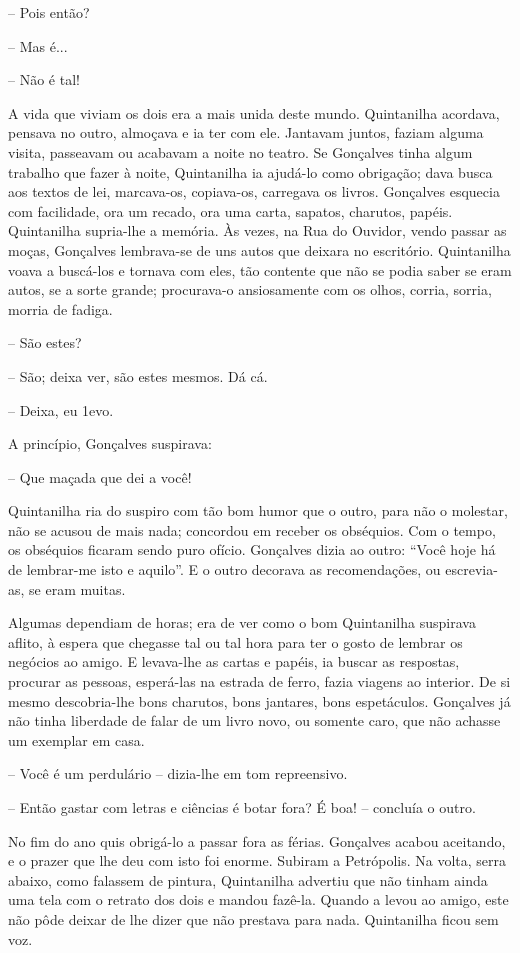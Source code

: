 -- Pois então?

-- Mas é...

-- Não é tal!

A vida que viviam os dois era a mais unida deste mundo. Quintanilha
acordava, pensava no outro, almoçava e ia ter com ele. Jantavam juntos,
faziam alguma visita, passeavam ou acabavam a noite no teatro. Se
Gonçalves tinha algum trabalho que fazer à noite, Quintanilha ia
ajudá-lo como obrigação; dava busca aos textos de lei, marcava-os,
copiava-os, carregava os livros. Gonçalves esquecia com facilidade, ora
um recado, ora uma carta, sapatos, charutos, papéis. Quintanilha
supria-lhe a memória. Às vezes, na Rua do Ouvidor, vendo passar as
moças, Gonçalves lembrava-se de uns autos que deixara no escritório.
Quintanilha voava a buscá-los e tornava com eles, tão contente que não
se podia saber se eram autos, se a sorte grande; procurava-o
ansiosamente com os olhos, corria, sorria, morria de fadiga.

-- São estes?

-- São; deixa ver, são estes mesmos. Dá cá.

-- Deixa, eu 1evo.

A princípio, Gonçalves suspirava:

-- Que maçada que dei a você!

Quintanilha ria do suspiro com tão bom humor que o outro, para não o
molestar, não se acusou de mais nada; concordou em receber os obséquios.
Com o tempo, os obséquios ficaram sendo puro ofício. Gonçalves dizia ao
outro: ``Você hoje há de lembrar-me isto e aquilo''. E o outro decorava
as recomendações, ou escrevia-as, se eram muitas.

Algumas dependiam de horas; era de ver como o bom Quintanilha suspirava
aflito, à espera que chegasse tal ou tal hora para ter o gosto de
lembrar os negócios ao amigo. E levava-lhe as cartas e papéis, ia buscar
as respostas, procurar as pessoas, esperá-las na estrada de ferro, fazia
viagens ao interior. De si mesmo descobria-lhe bons charutos, bons
jantares, bons espetáculos. Gonçalves já não tinha liberdade de falar de
um livro novo, ou somente caro, que não achasse um exemplar em casa.

-- Você é um perdulário -- dizia-lhe em tom repreensivo.

-- Então gastar com letras e ciências é botar fora? É boa! -- concluía o
outro.

No fim do ano quis obrigá-lo a passar fora as férias. Gonçalves acabou
aceitando, e o prazer que lhe deu com isto foi enorme. Subiram a
Petrópolis. Na volta, serra abaixo, como falassem de pintura,
Quintanilha advertiu que não tinham ainda uma tela com o retrato dos
dois e mandou fazê-la. Quando a levou ao amigo, este não pôde deixar de
lhe dizer que não prestava para nada. Quintanilha ficou sem voz.

